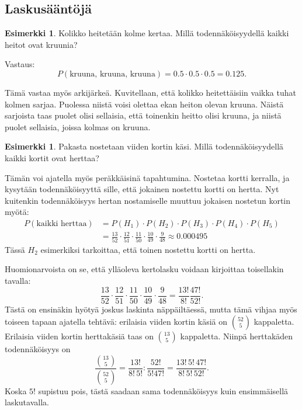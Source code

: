 \documentclass[12pt,leqno,a4paper,oneside]{amsart}
\theoremstyle{definition}
\newtheorem{example}[proclaim]{Esimerkki}
\theoremstyle{remark}
\numberwithin{equation}{section}
\begin{document}
\subsection{Laskusääntöjä}

\hspace{10pt}


\begin{example}
 Kolikko heitetään kolme kertaa. Millä toden\-näköisyydellä kaikki heitot ovat kruunia?
 
 Vastaus:
 $$P(\text{kruuna, kruuna, kruuna}) = 0.5\cdot 0.5 \cdot 0.5 = 0.125.$$
 
 Tämä vastaa myös arkijärkeä. Kuvitellaan, että kolikko heitettäisiin vaikka tuhat kolmen sarjaa. Puolessa niistä voisi olettaa ekan heiton
 olevan kruuna. Näistä sarjoista taas puolet olisi sellaisia, että toinenkin heitto olisi kruuna, ja niistä puolet sellaisia, joissa kolmas on kruuna.
\end{example}

\begin{example}
 Pakasta nostetaan viiden kortin käsi. Millä toden\-näköisyydellä kaikki kortit ovat herttaa?
 
 Tämän voi ajatella myös peräkkäisinä tapahtumina. Nostetaa kortti kerralla, ja kysytään todennäköisyyttä sille, että jokainen nostettu kort\-ti
 on hertta. Nyt kuitenkin todennäköisyys hertan nostamiselle muuttuu jokaisen nostetun kortin myötä:
 \begin{align*}
 P(\text{kaikki herttaa}) &= P(H_1)\cdot P(H_2)\cdot P(H_3)\cdot P(H_4)\cdot P(H_5)\\
 &= \frac{13}{52}\cdot\frac{12}{51}\cdot\frac{11}{50}\cdot\frac{10}{49}\cdot\frac{9}{48} \approx 0.000 495
 \end{align*}
 Tässä $H_2$ esimerkiksi tarkoittaa, että toinen nostettu kortti on hertta.
\end{example}

Huomionarvoista on se, että ylläoleva kertolasku voidaan kirjoittaa toisellakin tavalla:
$$\frac{13}{52}\cdot\frac{12}{51}\cdot\frac{11}{50}\cdot\frac{10}{49}\cdot\frac{9}{48} = \frac{13!}{8!} \frac{47!}{52!} .$$
Tästä on ensinäkin hyötyä joskus laskinta näppäiltäessä, mutta tämä vihjaa myös toiseen tapaan ajatella tehtävä: erilaisia viiden kortin käsiä
on ${52 \choose 5}$ kappaletta. Erilaisia viiden kortin herttakäsiä taas on ${13 \choose 5}$ kappaletta. Niinpä herttakäden todennäköisyys on
$$\frac{{13 \choose 5}}{{52 \choose 5}} = \frac{13!}{8!\, 5!} : \frac{52!}{5! 47!} = \frac{13!\, 5! \, 47!}{8!\, 5!\, 52!} .$$
Koska $5!$ supistuu pois, tästä saadaan sama todennäköisyys kuin ensimmäisellä laskutavalla.
\end{document}
